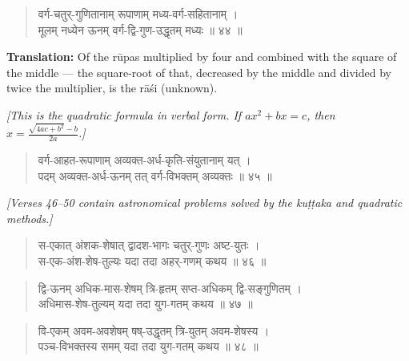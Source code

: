 \documentclass[11pt,a4paper]{article}
\newcommand{\cnote}[1]{\textcolor{notecolor}{\textit{#1}}}
\newenvironment{shloka}{\begin{verse}\devanagarifont\large}{\end{verse}}
\begin{document}
\vspace{0.3cm}

\begin{shloka}
वर्ग-चतुर्-गुणितानाम् रूपाणाम् मध्य-वर्ग-सहितानाम् ।\\
मूलम् नध्येन ऊनम् वर्ग-द्वि-गुण-उद्धृतम् मध्यः ॥ ४४ ॥
\end{shloka}

\textbf{Translation:}\quad
Of the rūpas multiplied by four and combined with the square of the
middle — the square-root of that, decreased by the middle and divided
by twice the multiplier, is the rāśi (unknown).

\vspace{0.3cm}
\cnote{[This is the quadratic formula in verbal form. If $ax^2 + bx = c$,
then $x = \frac{\sqrt{4ac + b^2} - b}{2a}$.]}
\vspace{0.3cm}

\begin{shloka}
वर्ग-आहत-रूपाणाम् अव्यक्त-अर्ध-कृति-संयुतानाम् यत् ।\\
पदम् अव्यक्त-अर्ध-ऊनम् तत् वर्ग-विभक्तम् अव्यक्तः ॥ ४५ ॥
\end{shloka}

\vspace{0.5cm}
\cnote{[Verses 46–50 contain astronomical problems solved by the
kuṭṭaka and quadratic methods.]}

\vspace{0.3cm}

\begin{shloka}
स-एकात् अंशक-शेषात् द्वादश-भागः चतुर्-गुणः अष्ट-युतः ।\\
स-एक-अंश-शेष-तुल्यः यदा तदा अहर्-गणम् कथय ॥ ४६ ॥
\end{shloka}

\vspace{0.3cm}

\begin{shloka}
द्वि-ऊनम् अधिक-मास-शेषम् त्रि-हृतम् सप्त-अधिकम् द्वि-सङ्गुणितम् ।\\
अधिमास-शेष-तुल्यम् यदा तदा युग-गतम् कथय ॥ ४७ ॥
\end{shloka}

\vspace{0.3cm}

\begin{shloka}
वि-एकम् अवम-अवशेषम् षष्-उद्धृतम् त्रि-युतम् अवम-शेषस्य ।\\
पञ्च-विभक्तस्य समम् यदा तदा युग-गतम् कथय ॥ ४८ ॥
\end{shloka}

\newpage
\end{document}
